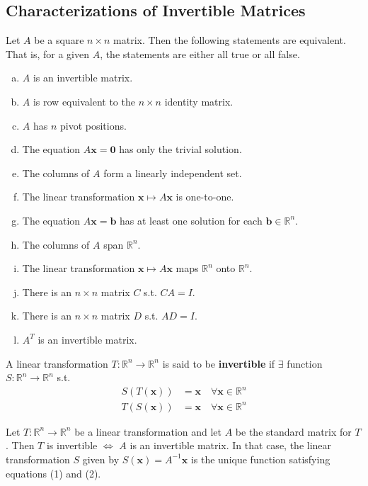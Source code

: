 \documentclass[11pt]{scrartcl}
\theoremstyle{dotlessP}
\theoremstyle{dotlessN}
\newcommand{\reals}{\mathbb{R}} %
\begin{document}
\subsection{Characterizations of Invertible Matrices}
\begin{theorem}
	Let $A$ be a square $n \times n$ matrix. Then the following statements are equivalent. That is, for a given $A$, the statements are either all true or all false.
	\begin{enumerate}[a.]
		\item $A$ is an invertible matrix.
		\item  $A$ is row equivalent to the $n \times n$ identity matrix.
		\item $A$ has $n$ pivot positions.
		\item The equation $A\bm{x} = \bm{0}$ has only the trivial solution.
		\item The columns of $A$ form a linearly independent set.
		\item The linear transformation $\bm{x} \mapsto A\bm{x}$ is one-to-one.
		\item The equation $A\bm{x} = \bm{b}$ has at least one solution for each $\bm{b} \in \reals^n$.
		\item The columns of $A$ span $\reals^n$.
		\item The linear transformation $\bm{x} \mapsto A\bm{x}$ maps $\reals^n$ onto $\reals^n$.
		\item There is an $n \times n$ matrix $C$ s.t. $CA = I$.
		\item There is an $n \times n$ matrix $D$ s.t. $AD = I$.
		\item $A^T$ is an invertible matrix.
	\end{enumerate}
\end{theorem}
\begin{definition}
	A linear transformation $T: \reals^n \to \reals^n$ is said to be \textbf{invertible} if $\exists$ function $S: \reals^n \to \reals^n$ s.t. 
	\begin{align}
		S(T(\bm{x})) &= \bm{x} \quad \forall \bm{x} \in \reals^n \\
		T(S(\bm{x})) &= \bm{x} \quad \forall \bm{x} \in \reals^n
	\end{align}
\end{definition}
\begin{theorem}
	Let $T: \reals^n \to \reals^n$ be a linear transformation and let $A$ be the standard matrix for $T$. Then $T$ is invertible $\iff$ $A$ is an invertible matrix. In that case, the linear transformation $S$ given by $S(\bm{x}) = A^{-1}\bm{x}$ is the unique function satisfying equations (1) and (2).
\end{theorem}
\end{document}
